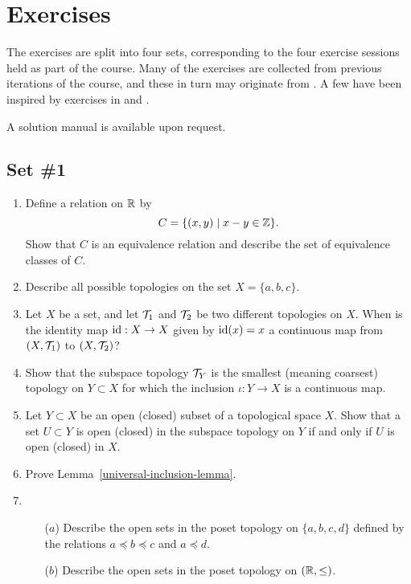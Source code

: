 \section{Exercises}
The exercises are split into four sets, corresponding to the four exercise sessions held as part of the course. Many of the exercises are collected from previous iterations of the course, and these in turn may originate from \cite{Mun}. A few have been inspired by exercises in \cite{DM} and \cite{Hat}.

A solution manual is available upon request.

\subsection{Set \#1}
\begin{enumerate}[label=1.\arabic*]
  \item Define a relation on $\mathbb{R}$ by
    \[
      C=\{(x,y) \mid x - y \in \mathbb{Z} \}.
    \]
    Show that $C$ is an equivalence relation and describe the set of equivalence classes of $C$.
  \item Describe all possible topologies on the set $X = \{a,b,c\}$.
  \item Let $X$ be a set, and let $\mathcal{T}_1$ and $\mathcal{T}_2$ be two different topologies on $X$. When is the identity map $\mathrm{id} : X \to X$ given by $\mathrm{id}(x) = x$ a continuous map from $(X,\mathcal{T}_1)$ to $(X,\mathcal{T}_2)$?
  \item
		Show that the subspace topology $\mathcal{T}_Y$ is the smallest (meaning coarsest) topology on $Y\subset X$ for which the inclusion $\iota:Y \rightarrow X$ is a continuous map.
	
	\item \label{opens-in-opens} Let $Y\subset X$ be an open (closed) subset of a topological space $X$. Show that a set $U \subset Y$ is open (closed) in the subspace topology on $Y$ if and only if $U$ is open (closed) in $X$.
	
	\item \label{universal-inclusion} Prove Lemma~\ref{universal-inclusion-lemma}.
	
  \item \begin{itemize}
		\item[($a$)] Describe the open sets in the poset topology on $\{a,b,c,d\}$ defined by the relations $a\preceq b\preceq c$ and $a\preceq d$.
		\item[($b$)] Describe the open sets in the poset topology on $(\mathbb{R},\leq)$.
	\end{itemize}
	

\end{enumerate}
